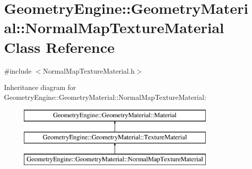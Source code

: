\hypertarget{class_geometry_engine_1_1_geometry_material_1_1_normal_map_texture_material}{}\section{Geometry\+Engine\+::Geometry\+Material\+::Normal\+Map\+Texture\+Material Class Reference}
\label{class_geometry_engine_1_1_geometry_material_1_1_normal_map_texture_material}


{\ttfamily \#include $<$Normal\+Map\+Texture\+Material.\+h$>$}

Inheritance diagram for Geometry\+Engine\+::Geometry\+Material\+::Normal\+Map\+Texture\+Material\+:\begin{figure}[H]
\begin{center}
\leavevmode
\includegraphics[height=3.000000cm]{class_geometry_engine_1_1_geometry_material_1_1_normal_map_texture_material}
\end{center}
\end{figure}
